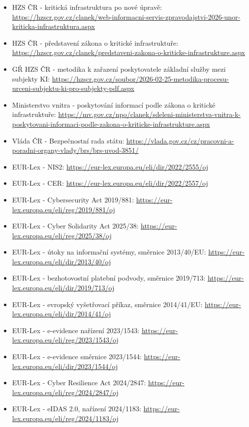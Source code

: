 \documentclass[11pt,a4paper]{article}
\begin{document}
\begin{itemize}
  \item HZS ČR - kritická infrastruktura po nové úpravě: \url{https://hzscr.gov.cz/clanek/web-informacni-servis-zpravodajstvi-2026-unor-kriticka-infrastruktura.aspx}
  \item HZS ČR - představení zákona o kritické infrastruktuře: \url{https://hzscr.gov.cz/clanek/predstaveni-zakona-o-kriticke-infrastrukture.aspx}
  \item GŘ HZS ČR - metodika k zařazení poskytovatele základní služby mezi subjekty KI: \url{https://hzscr.gov.cz/soubor/2026-02-25-metodika-procesu-urceni-subjektu-ki-pro-subjekty-pdf.aspx}
  \item Ministerstvo vnitra - poskytování informací podle zákona o kritické infrastruktuře: \url{https://mv.gov.cz/npo/clanek/sdeleni-ministerstva-vnitra-k-poskytovani-informaci-podle-zakona-o-kriticke-infrastrukture.aspx}
  \item Vláda ČR - Bezpečnostní rada státu: \url{https://vlada.gov.cz/cz/pracovni-a-poradni-organy-vlady/brs/brs-uvod-3851/}
  \item EUR-Lex - NIS2: \url{https://eur-lex.europa.eu/eli/dir/2022/2555/oj}
  \item EUR-Lex - CER: \url{https://eur-lex.europa.eu/eli/dir/2022/2557/oj}
  \item EUR-Lex - Cybersecurity Act 2019/881: \url{https://eur-lex.europa.eu/eli/reg/2019/881/oj}
  \item EUR-Lex - Cyber Solidarity Act 2025/38: \url{https://eur-lex.europa.eu/eli/reg/2025/38/oj}
  \item EUR-Lex - útoky na informační systémy, směrnice 2013/40/EU: \url{https://eur-lex.europa.eu/eli/dir/2013/40/oj}
  \item EUR-Lex - bezhotovostní platební podvody, směrnice 2019/713: \url{https://eur-lex.europa.eu/eli/dir/2019/713/oj}
  \item EUR-Lex - evropský vyšetřovací příkaz, směrnice 2014/41/EU: \url{https://eur-lex.europa.eu/eli/dir/2014/41/oj}
  \item EUR-Lex - e-evidence nařízení 2023/1543: \url{https://eur-lex.europa.eu/eli/reg/2023/1543/oj}
  \item EUR-Lex - e-evidence směrnice 2023/1544: \url{https://eur-lex.europa.eu/eli/dir/2023/1544/oj}
  \item EUR-Lex - Cyber Resilience Act 2024/2847: \url{https://eur-lex.europa.eu/eli/reg/2024/2847/oj}
  \item EUR-Lex - eIDAS 2.0, nařízení 2024/1183: \url{https://eur-lex.europa.eu/eli/reg/2024/1183/oj}

\end{itemize}
\end{document}
